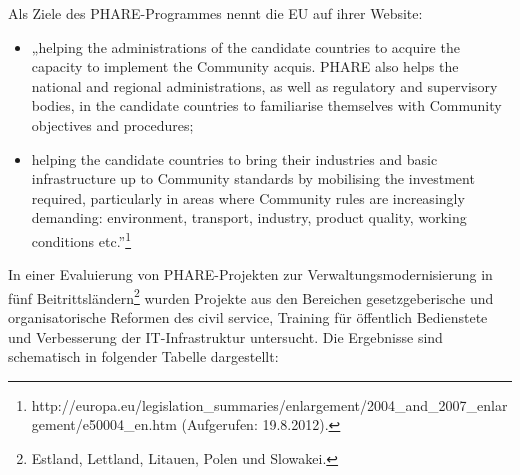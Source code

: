 Als Ziele des PHARE-Programmes nennt die EU auf ihrer Website:
\begin{itemize}
\item „helping the administrations of the candidate countries to acquire the capacity to implement the Community acquis. PHARE also helps the national and regional administrations, as well as regulatory and supervisory bodies, in the candidate countries to familiarise themselves with Community objectives and procedures;
\item helping the candidate countries to bring their industries and basic infrastructure up to Community standards by mobilising the investment required, particularly in areas where Community rules are increasingly demanding: environment, transport, industry, product quality, working conditions etc.”\footnote{http://europa.eu/legislation\_summaries/enlargement/2004\_and\_2007\_enlargement/e50004\_en.htm (Aufgerufen: 19.8.2012).}
\end{itemize}
In einer Evaluierung von PHARE-Projekten zur Verwaltungsmodernisierung in fünf Beitrittsländern\footnote{Estland, Lettland, Litauen, Polen und Slowakei.} wurden Projekte aus den Bereichen gesetzgeberische und organisatorische Reformen des civil service, Training für öffentlich Bedienstete und Verbesserung der IT-Infrastruktur untersucht. Die Ergebnisse sind schematisch in folgender Tabelle dargestellt:
\renewcommand{\arraystretch}{1}
